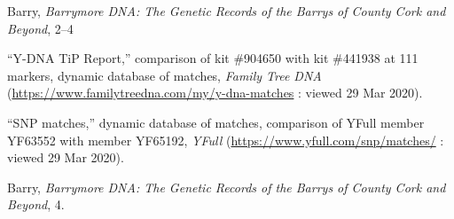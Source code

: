 \begin{thebibliography}{999}
Barry, \textit{Barrymore DNA: The Genetic Records of the Barrys of County Cork and Beyond}, 2--4

``Y-DNA TiP Report,'' comparison of kit \#904650 with kit \#441938 at 111 markers, dynamic database of matches, \textit{Family Tree DNA} (\url{https://www.familytreedna.com/my/y-dna-matches} : viewed 29 Mar 2020).

``SNP matches,'' dynamic database of matches, comparison of YFull member YF63552 with member YF65192, \textit{YFull} (\url{https://www.yfull.com/snp/matches/} : viewed 29 Mar 2020).

Barry, \textit{Barrymore DNA: The Genetic Records of the Barrys of County Cork and Beyond}, 4.

\end{thebibliography}